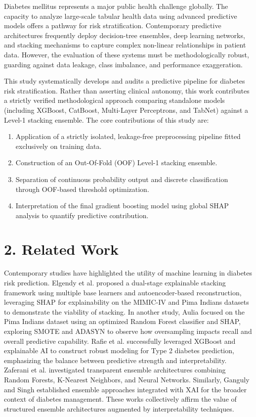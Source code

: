\documentclass[conference]{IEEEtran}
\begin{document}
Diabetes mellitus represents a major public health challenge globally. The capacity to analyze large-scale tabular health data using advanced predictive models offers a pathway for risk stratification. Contemporary predictive architectures frequently deploy decision-tree ensembles, deep learning networks, and stacking mechanisms to capture complex non-linear relationships in patient data. However, the evaluation of these systems must be methodologically robust, guarding against data leakage, class imbalance, and performance exaggeration.

This study systematically develops and audits a predictive pipeline for diabetes risk stratification. Rather than asserting clinical autonomy, this work contributes a strictly verified methodological approach comparing standalone models (including XGBoost, CatBoost, Multi-Layer Perceptrons, and TabNet) against a Level-1 stacking ensemble. The core contributions of this study are:
\begin{enumerate}
\item Application of a strictly isolated, leakage-free preprocessing pipeline fitted exclusively on training data.
\item Construction of an Out-Of-Fold (OOF) Level-1 stacking ensemble.
\item Separation of continuous probability output and discrete classification through OOF-based threshold optimization.
\item Interpretation of the final gradient boosting model using global SHAP analysis to quantify predictive contribution.
\end{enumerate}



\section{2. Related Work}
Contemporary studies have highlighted the utility of machine learning in diabetes risk prediction. Elgendy et al. \cite{ref1} proposed a dual-stage explainable stacking framework using multiple base learners and autoencoder-based reconstruction, leveraging SHAP for explainability on the MIMIC-IV and Pima Indians datasets to demonstrate the viability of stacking. In another study, Aulia \cite{ref2} focused on the Pima Indians dataset using an optimized Random Forest classifier and SHAP, exploring SMOTE and ADASYN to observe how oversampling impacts recall and overall predictive capability. Rafie et al. \cite{ref3} successfully leveraged XGBoost and explainable AI to construct robust modeling for Type 2 diabetes prediction, emphasizing the balance between predictive strength and interpretability. Zaferani et al. \cite{ref4} investigated transparent ensemble architectures combining Random Forests, K-Nearest Neighbors, and Neural Networks. Similarly, Ganguly and Singh \cite{ref5} established ensemble approaches integrated with XAI for the broader context of diabetes management. These works collectively affirm the value of structured ensemble architectures augmented by interpretability techniques.
\end{document}
